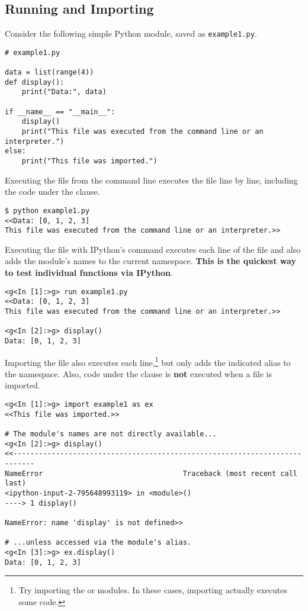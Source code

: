 \subsection*{Running and Importing} %

Consider the following simple Python module, saved as \texttt{example1.py}.

\begin{lstlisting}
# example1.py

data = list(range(4))
def display():
    print("Data:", data)

if __name__ == "__main__":
    display()
    print("This file was executed from the command line or an interpreter.")
else:
    print("This file was imported.")
\end{lstlisting}

Executing the file from the command line executes the file line by line, including the code under the  clause.

\begin{lstlisting}
$ python example1.py
<<Data: [0, 1, 2, 3]
This file was executed from the command line or an interpreter.>>
\end{lstlisting}

Executing the file with IPython's  command executes each line of the file and also adds the module's names to the current namespace.
\textbf{This is the quickest way to test individual functions via IPython}.

\begin{lstlisting}
<g<In [1]:>g> run example1.py
<<Data: [0, 1, 2, 3]
This file was executed from the command line or an interpreter.>>

<g<In [2]:>g> display()
Data: [0, 1, 2, 3]
\end{lstlisting}

Importing the file also executes each line,\footnote{Try importing the  or  modules.
In these cases, importing actually executes some code.} but only adds the indicated alias to the namespace.
Also, code under the  clause is \textbf{not} executed when a file is imported.

\begin{lstlisting}
<g<In [1]:>g> import example1 as ex
<<This file was imported.>>

# The module's names are not directly available...
<g<In [2]:>g> display()
<<---------------------------------------------------------------------------
NameError                                 Traceback (most recent call last)
<ipython-input-2-795648993119> in <module>()
----> 1 display()

NameError: name 'display' is not defined>>

# ...unless accessed via the module's alias.
<g<In [3]:>g> ex.display()
Data: [0, 1, 2, 3]
\end{lstlisting}

